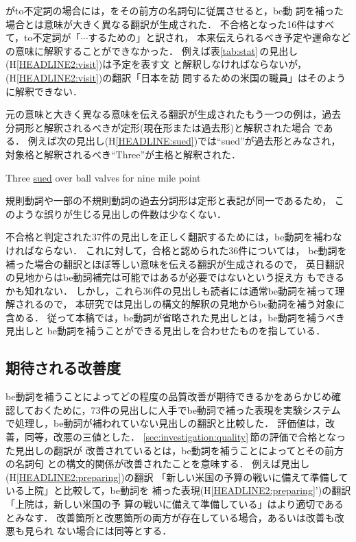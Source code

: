 \KEY がto不定詞の場合には，\KEY をその前方の名詞句に従属させると，be動
詞を補った場合とは意味が大きく異なる翻訳が生成された．
不合格となった16件はすべて，to不定詞が「$\cdots$するための」と訳され，
本来伝えられるべき予定や運命などの意味に解釈することができなかった．
例えば表\ref{tab:stat}\,の見出し(H\ref{HEADLINE2:visit})は予定を表す文
と解釈しなければならないが，(H\ref{HEADLINE2:visit})の翻訳「日本を訪
問するための米国の職員」はそのように解釈できない．

元の意味と大きく異なる意味を伝える翻訳が生成されたもう一つの例は，過去
分詞形と解釈されるべき\KEY が定形(現在形または過去形)と解釈された場合
である．
例えば次の見出し(H\ref{HEADLINE:sued})では``sued''が過去形とみなされ，
対象格と解釈されるべき``Three''が主格と解釈された．
\begin{HEADLINE}
\headline Three \underline{sued} over ball valves for nine mile point
\label{HEADLINE:sued}
\end{HEADLINE}
規則動詞や一部の不規則動詞の過去分詞形は定形と表記が同一であるため，
このような誤りが生じる見出しの件数は少なくない．

不合格と判定された37件の見出しを正しく翻訳するためには，be動詞を補わな
ければならない．
これに対して，合格と認められた36件については，
be動詞を補った場合の翻訳とほぼ等しい意味を伝える翻訳が生成されるので，
英日翻訳の見地からはbe動詞補完は可能ではあるが必要ではないという捉え方
もできるかも知れない．
しかし，これら36件の見出しも読者には通常be動詞を補って理解されるので，
本研究では見出しの構文的解釈の見地からbe動詞を補う対象に含める．
従って本稿では，be動詞が省略された見出しとは，be動詞を補うべき見出しと
be動詞を補うことができる見出しを合わせたものを指している．

\subsection{期待される改善度}
\label{sec:investigation:improve}

be動詞を補うことによってどの程度の品質改善が期待できるかをあらかじめ確
認しておくために，73件の見出しに人手でbe動詞で補った表現を実験システム
で処理し，be動詞が補われていない見出しの翻訳と比較した．
評価値は，改善，同等，改悪の三値とした．
\ref{sec:investigation:quality}\,節の評価で合格となった見出しの翻訳が
改善されているとは，be動詞を補うことによって\KEY とその前方の名詞句
との構文的関係が改善されたことを意味する．
例えば見出し(H\ref{HEADLINE2:preparing})の翻訳
「新しい米国の予算の戦いに備えて準備している上院」と比較して，be動詞を
補った表現(H\ref{HEADLINE2:preparing}')の翻訳「上院は，新しい米国の予
算の戦いに備えて準備している」はより適切であるとみなす．
改善箇所と改悪箇所の両方が存在している場合，あるいは改善も改悪も見られ
ない場合には同等とする．

